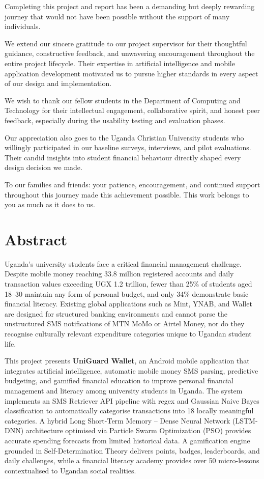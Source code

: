 \documentclass[12pt,a4paper]{report}
\begin{document}
Completing this project and report has been a demanding but deeply rewarding journey
that would not have been possible without the support of many individuals.

We extend our sincere gratitude to our project supervisor for their thoughtful guidance,
constructive feedback, and unwavering encouragement throughout the entire project
lifecycle. Their expertise in artificial intelligence and mobile application development
motivated us to pursue higher standards in every aspect of our design and implementation.

We wish to thank our fellow students in the Department of Computing and Technology
for their intellectual engagement, collaborative spirit, and honest peer feedback,
especially during the usability testing and evaluation phases.

Our appreciation also goes to the Uganda Christian University students who willingly
participated in our baseline surveys, interviews, and pilot evaluations. Their candid
insights into student financial behaviour directly shaped every design decision we made.

To our families and friends: your patience, encouragement, and continued support
throughout this journey made this achievement possible. This work belongs to you as
much as it does to us.

\chapter*{Abstract}

Uganda's university students face a critical financial management challenge. Despite
mobile money reaching 33.8 million registered accounts and daily transaction values
exceeding UGX 1.2 trillion, fewer than 25\% of students aged 18--30 maintain any form
of personal budget, and only 34\% demonstrate basic financial literacy. Existing global
applications such as Mint, YNAB, and Wallet are designed for structured banking
environments and cannot parse the unstructured SMS notifications of MTN MoMo or
Airtel Money, nor do they recognise culturally relevant expenditure categories unique to
Ugandan student life.

This project presents \textbf{UniGuard Wallet}, an Android mobile application that
integrates artificial intelligence, automatic mobile money SMS parsing, predictive
budgeting, and gamified financial education to improve personal financial management
and literacy among university students in Uganda. The system implements an SMS
Retriever API pipeline with regex and Gaussian Naive Bayes classification to
automatically categorise transactions into 18 locally meaningful categories. A hybrid
Long Short-Term Memory -- Dense Neural Network (LSTM-DNN) architecture optimised
via Particle Swarm Optimization (PSO) provides accurate spending forecasts from
limited historical data. A gamification engine grounded in Self-Determination Theory
delivers points, badges, leaderboards, and daily challenges, while a financial literacy
academy provides over 50 micro-lessons contextualised to Ugandan social realities.
\end{document}
